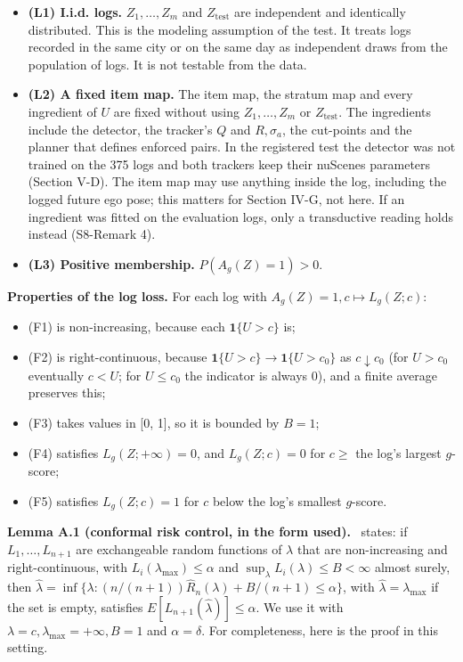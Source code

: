 \documentclass{ieeeaccess}
\begin{document}
\begin{itemize}
\item \textbf{(L1) I.i.d. logs.} $Z_{1}, \dots, Z_{m}$ and $Z_{\mathrm{test}}$ are independent and identically distributed. This is the modeling assumption of the test. It treats logs recorded in the same city or on the same day as independent draws from the population of logs. It is not testable from the data.
\item \textbf{(L2) A fixed item map.} The item map, the stratum map and every ingredient of $U$ are fixed without using $Z_{1}, \dots, Z_{m}$ or $Z_{\mathrm{test}}$. The ingredients include the detector, the tracker's $Q$ and $R, \sigma_{a}$, the cut-points and the planner that defines enforced pairs. In the registered test the detector was not trained on the 375 logs and both trackers keep their nuScenes parameters (Section V-D). The item map may use anything inside the log, including the logged future ego pose; this matters for Section IV-G, not here. If an ingredient was fitted on the evaluation logs, only a transductive reading holds instead (S8-Remark 4).
\item \textbf{(L3) Positive membership.} $P(A_{g}(Z) = 1) > 0$.
\end{itemize}

\textbf{Properties of the log loss.} For each log with $A_{g}(Z) = 1, c \mapsto L_{g}(Z; c)$:

\begin{itemize}
\item (F1) is non-increasing, because each $\mathbf{1}\{U > c\}$ is;
\item (F2) is right-continuous, because $\mathbf{1}\{U > c\} \to \mathbf{1}\{U > c_{0}\}$ as $c \downarrow c_{0}$ (for $U > c_{0}$ eventually $c < U$; for $U \leq c_{0}$ the indicator is always 0), and a finite average preserves this;
\item (F3) takes values in [0, 1], so it is bounded by $B = 1$;
\item (F4) satisfies $L_{g}(Z; +\infty) = 0$, and $L_{g}(Z; c) = 0$ for $c \geq$ the log's largest $g$-score;
\item (F5) satisfies $L_{g}(Z; c) = 1$ for $c$ below the log's smallest $g$-score.
\end{itemize}

\textbf{Lemma A.1 (conformal risk control, in the form used).}~\cite[Thm.~1]{Angelopoulos2024} states: if $L_{1}, \dots, L_{n+1}$ are exchangeable random functions of $\lambda$ that are non-increasing and right-continuous, with $L_{i}(\lambda_{\max}) \leq \alpha$ and $\sup_{\lambda} L_{i}(\lambda) \leq B < \infty$ almost surely, then $\hat{\lambda} = \inf\{\lambda : (n/(n + 1))\hat{R}_{n}(\lambda) + B/(n + 1) \leq \alpha\}$, with $\hat{\lambda} = \lambda_{\max}$ if the set is empty, satisfies $E[L_{n+1}(\hat{\lambda})] \leq \alpha$. We use it with $\lambda = c, \lambda_{\max} = +\infty, B = 1$ and $\alpha = \delta$. For completeness, here is the proof in this setting.
\end{document}
